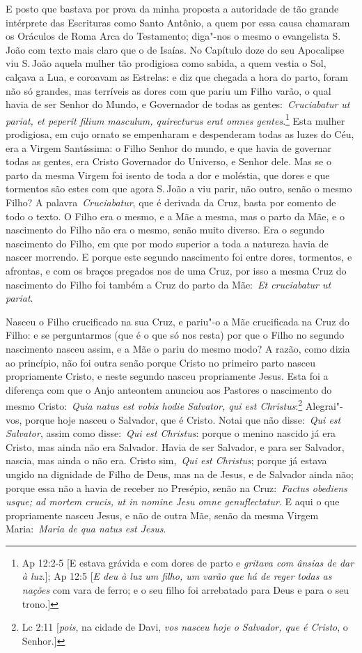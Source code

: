 E posto que bastava por prova da minha proposta a autoridade
de tão grande intérprete das Escrituras como Santo Antônio, a quem por
essa causa chamaram os Oráculos de Roma Arca do Testamento; diga"-nos o
mesmo o evangelista S.\,João com texto mais claro que o de Isaías. No
Capítulo doze do seu Apocalipse viu S.\,João aquela mulher tão prodigiosa
como sabida, a quem vestia o Sol, calçava a Lua, e coroavam as Estrelas:
e diz que chegada a hora do parto, foram não só grandes, mas terríveis
as dores com que pariu um Filho varão, o qual havia de ser Senhor do
Mundo, e Governador de todas as gentes:~\emph{Cruciabatur ut pariat, et
peperit filium masculum, quirecturus erat omnes
gentes}.\footnote{Ap 12:2-5 [E estava grávida e com dores de parto e \textit{gritava com ânsias de dar à luz}.]; Ap 12:5 [\textit{E deu à luz um filho, um varão que há de reger todas as nações} com vara de ferro; e o seu filho foi arrebatado para Deus e para o seu trono.]} Esta mulher prodigiosa, em cujo ornato se
empenharam e despenderam todas as luzes do Céu, era a Virgem Santíssima:
o Filho Senhor do mundo, e que havia de governar todas as gentes, era
Cristo Governador do Universo, e Senhor dele. Mas se o parto da mesma
Virgem foi isento de toda a dor e moléstia, que dores e que tormentos
são estes com que agora S.\,João a viu parir, não outro, senão o mesmo
Filho? A palavra~\emph{Cruciabatur}, que é derivada da Cruz, basta por
comento de todo o texto. O Filho era o mesmo, e a Mãe a mesma, mas o
parto da Mãe, e o nascimento do Filho não era o mesmo, senão muito
diverso. Era o segundo nascimento do Filho, em que por modo superior a
toda a natureza havia de nascer morrendo. E porque este segundo
nascimento foi entre dores, tormentos, e afrontas, e com os braços
pregados nos de uma Cruz, por isso a mesma Cruz do nascimento do Filho
foi também a Cruz do parto da Mãe:~\emph{Et cruciabatur ut pariat}.


Nasceu o Filho crucificado na sua Cruz, e pariu"-o a Mãe
crucificada na Cruz do Filho: e se perguntarmos (que é o que só nos
resta) por que o Filho no segundo nascimento nasceu assim, e a Mãe o
pariu do mesmo modo? A razão, como dizia ao princípio, não foi outra
senão porque Cristo no primeiro parto nasceu propriamente Cristo, e
neste segundo nasceu propriamente Jesus. Esta foi a diferença com que o
Anjo anteontem anunciou aos Pastores o nascimento do mesmo
Cristo:~\emph{Quia natus est vobis hodie Salvator, qui est
Christus}:\footnote{Lc 2:11 [\textit{pois}, na cidade de Davi, \textit{vos nasceu hoje o Salvador, que é Cristo}, o Senhor.]} Alegrai"-vos, porque hoje nasceu o Salvador,
que é Cristo. Notai que não disse:~\emph{Qui est Salvator}, assim como
disse:~\emph{Qui est Christus}: porque o menino nascido já era Cristo,
mas ainda não era Salvador. Havia de ser Salvador, e para ser Salvador,
nascia, mas ainda o não era. Cristo sim,~\emph{Qui est Christus}; porque
já estava ungido na dignidade de Filho de Deus, mas na de Jesus, e de
Salvador ainda não; porque essa não a havia de receber no Presépio,
senão na Cruz:~\emph{Factus obediens usque; ad mortem crucis, ut in
nomine Jesu omne genuflectatur}. E aqui o que propriamente nasceu Jesus,
e não de outra Mãe, senão da mesma Virgem Maria:~\emph{Maria de qua
natus est Jesus}.


